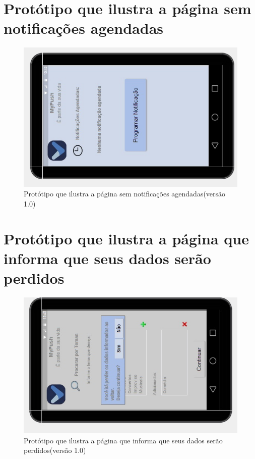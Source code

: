 \begin{apendicesenv}
    \pagebreak
      \section*{Protótipo que ilustra a página sem notificações agendadas}

    \begin{figure}[!htbp]
      \centering
      \includegraphics[scale=0.9, angle=-90]{editaveis/figuras/prototipo_alta_fidelidade_v1/1_9}
      \caption{Protótipo que ilustra a página sem notificações agendadas(versão 1.0)}
      \label{v1}
    \end{figure}
    
    \pagebreak
      \section*{Protótipo que ilustra a página que informa que seus dados serão perdidos}

    \begin{figure}[!htbp]
      \centering
      \includegraphics[scale=0.9, angle=-90]{editaveis/figuras/prototipo_alta_fidelidade_v1/1_10}
      \caption{Protótipo que ilustra a página que informa que seus dados serão perdidos(versão 1.0)}
      \label{v1}
    \end{figure}
    

\end{apendicesenv}
